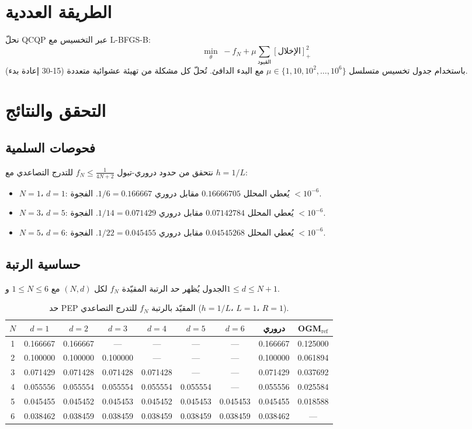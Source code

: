 \documentclass[12pt,a4paper]{article}
\theoremstyle{arabicremark}
\begin{document}
\section{الطريقة العددية}

نحلّ QCQP عبر التخسيس مع L-BFGS-B:
\[
\min_\theta \; -f_N + \mu \sum_{\text{القيود}} [\text{الإخلال}]^2_+
\]
باستخدام جدول تخسيس متسلسل $\mu \in \{1, 10, 10^2, \ldots, 10^6\}$ مع البدء الدافئ. تُحلّ كل مشكلة من تهيئة عشوائية متعددة (15-30 إعادة بدء).

\section{التحقق والنتائج}

\subsection{فحوصات السلمية}

نتحقق من حدود دروري-تبول $f_N \leq \frac{1}{4N+2}$ للتدرج التصاعدي مع $h = 1/L$:
\begin{itemize}
\item $N=1$، $d=1$: يُعطي المحلل $0.16666705$ مقابل دروري $1/6 = 0.166667$. الفجوة $< 10^{-6}$.
\item $N=3$، $d=5$: يُعطي المحلل $0.07142784$ مقابل دروري $1/14 = 0.071429$. الفجوة $< 10^{-6}$.
\item $N=5$، $d=6$: يُعطي المحلل $0.04545268$ مقابل دروري $1/22 = 0.045455$. الفجوة $< 10^{-6}$.
\end{itemize}

\subsection{حساسية الرتبة}

الجدول يُظهر حد الرتبة المقيّدة $f_N$ لكل $(N, d)$ مع $1 \leq N \leq 6$ و$1 \leq d \leq N+1$.

\begin{table}[h]
\centering
\caption{حد PEP المقيّد بالرتبة $f_N$ للتدرج التصاعدي ($h=1/L$، $L=1$، $R=1$).}
\label{tab:heatmap}
\begin{tabular}{c|cccccc|cc}
\toprule
$N$ & $d{=}1$ & $d{=}2$ & $d{=}3$ & $d{=}4$ & $d{=}5$ & $d{=}6$ & دروري & OGM$_{\mathrm{ref}}$ \\
\midrule
1 & 0.166667 & 0.166667 & --- & --- & --- & --- & 0.166667 & 0.125000 \\
2 & 0.100000 & 0.100000 & 0.100000 & --- & --- & --- & 0.100000 & 0.061894 \\
3 & 0.071429 & 0.071428 & 0.071428 & 0.071428 & --- & --- & 0.071429 & 0.037692 \\
4 & 0.055556 & 0.055554 & 0.055554 & 0.055554 & 0.055554 & --- & 0.055556 & 0.025584 \\
5 & 0.045455 & 0.045452 & 0.045453 & 0.045452 & 0.045453 & 0.045453 & 0.045455 & 0.018588 \\
6 & 0.038462 & 0.038459 & 0.038459 & 0.038459 & 0.038459 & 0.038459 & 0.038462 & --- \\
\bottomrule
\end{tabular}
\end{table}
\end{document}
